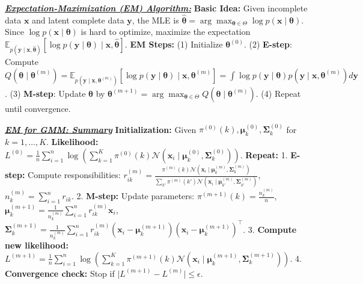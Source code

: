 \documentclass[10pt]{article}
\newcommand{\bulletPoint}[1]{\ul{\textit{\textbf{#1}}}}
\begin{document}
\begin{multicols*}{2}
\bulletPoint{Expectation-Maximization (EM) Algorithm:}\quad
\textbf{Basic Idea:} Given incomplete data $\mathbf{x}$ and latent complete data $\mathbf{y}$, the MLE is $\hat{\boldsymbol{\theta}} = \arg\max_{\boldsymbol{\theta} \in \Theta} \log p(\mathbf{x} \mid \boldsymbol{\theta})$. Since $\log p(\mathbf{x} \mid \boldsymbol{\theta})$ is hard to optimize, maximize the expectation $\mathbb{E}_{p(\mathbf{y} \mid \mathbf{x}, \hat{\boldsymbol{\theta}})} \left[ \log p(\mathbf{y} \mid \boldsymbol{\theta}) \mid \mathbf{x}, \hat{\boldsymbol{\theta}} \right]$. 
\textbf{EM Steps:} (1) Initialize $\boldsymbol{\theta}^{(0)}$. (2) \textbf{E-step}: Compute $Q(\boldsymbol{\theta} \mid \boldsymbol{\theta}^{(m)}) = \mathbb{E}_{p(\mathbf{y} \mid \mathbf{x}, \boldsymbol{\theta}^{(m)})} \left[ \log p(\mathbf{y} \mid \boldsymbol{\theta}) \mid \mathbf{x}, \boldsymbol{\theta}^{(m)} \right] = \int \log p(\mathbf{y} \mid \boldsymbol{\theta}) p(\mathbf{y} \mid \mathbf{x}, \boldsymbol{\theta}^{(m)}) d\mathbf{y}$. (3) \textbf{M-step}: Update $\boldsymbol{\theta}$ by $\boldsymbol{\theta}^{(m+1)} = \arg\max_{\boldsymbol{\theta} \in \Theta} Q(\boldsymbol{\theta} \mid \boldsymbol{\theta}^{(m)})$. (4) Repeat until convergence.

\bulletPoint{EM for GMM: Summary}\quad 
\textbf{Initialization:} Given $\pi^{(0)}(k), \boldsymbol{\mu}_k^{(0)}, \boldsymbol{\Sigma}_k^{(0)}$ for $k=1,\dots,K$. 
\textbf{Likelihood:} $L^{(0)} = \frac{1}{n} \sum_{i=1}^{n} \log \left( \sum_{k=1}^{K} \pi^{(0)}(k) \mathcal{N} (\mathbf{x}_i \mid \boldsymbol{\mu}_k^{(0)}, \boldsymbol{\Sigma}_k^{(0)}) \right)$. 
\textbf{Repeat:}
1. \textbf{E-step:} Compute responsibilities:
    $r_{ik}^{(m)} = \frac{\pi^{(m)}(k) \mathcal{N} (\mathbf{x}_i \mid \boldsymbol{\mu}_k^{(m)}, \boldsymbol{\Sigma}_k^{(m)})}{\sum_{k'} \pi^{(m)}(k') \mathcal{N} (\mathbf{x}_i \mid \boldsymbol{\mu}_{k'}^{(m)}, \boldsymbol{\Sigma}_{k'}^{(m)})}$,  
    $n_k^{(m)} = \sum_{i=1}^{n} r_{ik}$. 
2. \textbf{M-step:} Update parameters:
    $\pi^{(m+1)}(k) = \frac{n_k^{(m)}}{n}$,  
    $\boldsymbol{\mu}_k^{(m+1)} = \frac{1}{n_k^{(m)}} \sum_{i=1}^{n} r_{ik}^{(m)} \mathbf{x}_i$,  
    $\boldsymbol{\Sigma}_k^{(m+1)} = \frac{1}{n_k^{(m)}} \sum_{i=1}^{n} r_{ik}^{(m)} (\mathbf{x}_i - \boldsymbol{\mu}_k^{(m+1)})(\mathbf{x}_i - \boldsymbol{\mu}_k^{(m+1)})^\top$. 
3. \textbf{Compute new likelihood:}
    $L^{(m+1)} = \frac{1}{n} \sum_{i=1}^{n} \log \left( \sum_{k=1}^{K} \pi^{(m+1)}(k) \mathcal{N} (\mathbf{x}_i \mid \boldsymbol{\mu}_k^{(m+1)}, \boldsymbol{\Sigma}_k^{(m+1)}) \right)$. 
4. \textbf{Convergence check:} Stop if $\lvert L^{(m+1)} - L^{(m)} \rvert \leq \epsilon$.
    


\end{multicols*}
\end{document}
